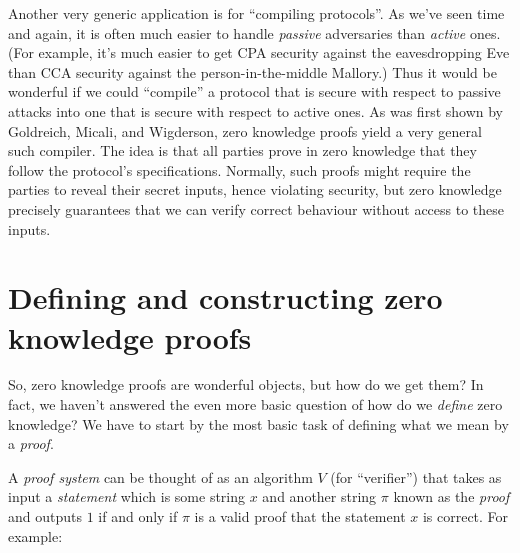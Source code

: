 Another very generic application is for ``compiling protocols''. As
we've seen time and again, it is often much easier to handle
\emph{passive} adversaries than \emph{active} ones. (For example, it's
much easier to get CPA security against the eavesdropping Eve than CCA
security against the person-in-the-middle Mallory.) Thus it would be
wonderful if we could ``compile'' a protocol that is secure with respect
to passive attacks into one that is secure with respect to active ones.
As was first shown by Goldreich, Micali, and Wigderson, zero knowledge
proofs yield a very general such compiler. The idea is that all parties
prove in zero knowledge that they follow the protocol's specifications.
Normally, such proofs might require the parties to reveal their secret
inputs, hence violating security, but zero knowledge precisely
guarantees that we can verify correct behaviour without access to these
inputs.

\section{Defining and constructing zero knowledge
proofs}\label{Defining-and-constructing}

So, zero knowledge proofs are wonderful objects, but how do we get them?
In fact, we haven't answered the even more basic question of how do we
\emph{define} zero knowledge? We have to start by the most basic task of
defining what we mean by a \emph{proof}.

A \emph{proof system} can be thought of as an algorithm \(V\) (for
``verifier'') that takes as input a \emph{statement} which is some
string \(x\) and another string \(\pi\) known as the \emph{proof} and
outputs \(1\) if and only if \(\pi\) is a valid proof that the statement
\(x\) is correct. For example:

